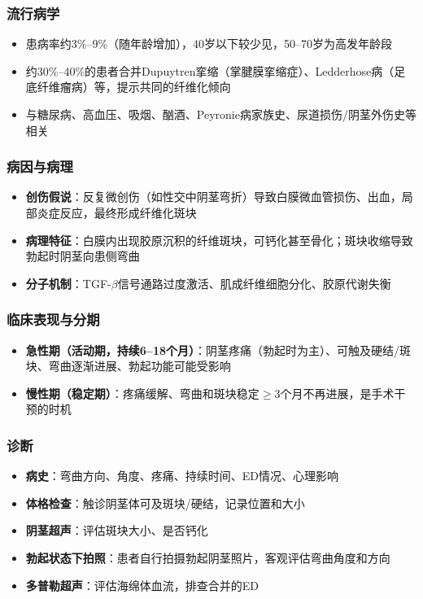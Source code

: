 \subsubsection{流行病学}

\begin{itemize}[leftmargin=2cm]
	\item 患病率约3\%--9\%（随年龄增加），40岁以下较少见，50--70岁为高发年龄段
	\item 约30\%--40\%的患者合并Dupuytren挛缩（掌腱膜挛缩症）、Ledderhose病（足底纤维瘤病）等，提示共同的纤维化倾向
	\item 与糖尿病、高血压、吸烟、酗酒、Peyronie病家族史、尿道损伤/阴茎外伤史等相关
\end{itemize}

\subsubsection{病因与病理}

\begin{itemize}[leftmargin=2cm]
	\item \textbf{创伤假说}：反复微创伤（如性交中阴茎弯折）导致白膜微血管损伤、出血，局部炎症反应，最终形成纤维化斑块
	\item \textbf{病理特征}：白膜内出现胶原沉积的纤维斑块，可钙化甚至骨化；斑块收缩导致勃起时阴茎向患侧弯曲
	\item \textbf{分子机制}：TGF-$\beta$信号通路过度激活、肌成纤维细胞分化、胶原代谢失衡
\end{itemize}

\subsubsection{临床表现与分期}

\begin{itemize}[leftmargin=2cm]
	\item \textbf{急性期（活动期，持续6--18个月）}：阴茎疼痛（勃起时为主）、可触及硬结/斑块、弯曲逐渐进展、勃起功能可能受影响
	\item \textbf{慢性期（稳定期）}：疼痛缓解、弯曲和斑块稳定$\ge$3个月不再进展，是手术干预的时机
\end{itemize}

\subsubsection{诊断}

\begin{itemize}[leftmargin=2cm]
	\item \textbf{病史}：弯曲方向、角度、疼痛、持续时间、ED情况、心理影响
	\item \textbf{体格检查}：触诊阴茎体可及斑块/硬结，记录位置和大小
	\item \textbf{阴茎超声}：评估斑块大小、是否钙化
	\item \textbf{勃起状态下拍照}：患者自行拍摄勃起阴茎照片，客观评估弯曲角度和方向
	\item \textbf{多普勒超声}：评估海绵体血流，排查合并的ED
\end{itemize}

